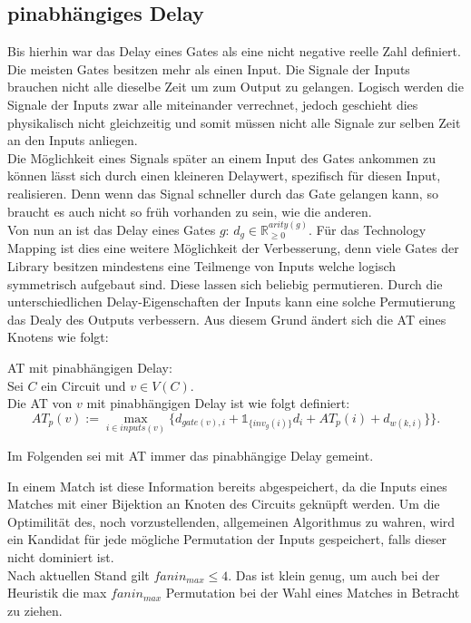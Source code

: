 \documentclass[11pt, a4paper, german]{article}
\newcommand{\TM}{Technology  Mapping }
\begin{document}
\subsection{pinabhängiges Delay}
\label{subsec:pinabh_delay}
Bis hierhin war das Delay eines Gates als eine nicht negative reelle Zahl definiert. Die meisten Gates besitzen mehr als einen Input. Die Signale der Inputs brauchen nicht alle dieselbe Zeit um zum Output zu gelangen. Logisch werden die Signale der Inputs zwar alle miteinander verrechnet, jedoch geschieht dies physikalisch nicht gleichzeitig und somit müssen nicht alle Signale zur selben Zeit an den Inputs anliegen.\\
Die Möglichkeit eines Signals später an einem Input des Gates ankommen zu können lässt sich durch einen kleineren Delaywert, spezifisch für diesen Input, realisieren. Denn wenn das Signal schneller durch das Gate gelangen kann, so braucht es auch nicht so früh vorhanden zu sein, wie die anderen. \\
Von nun an ist das Delay eines Gates $g$: $d_g \in \mathbb{R}_{\geq 0}^{arity(g)}$. Für das \TM ist dies eine weitere Möglichkeit der Verbesserung, denn viele Gates der Library besitzen mindestens eine Teilmenge von Inputs welche logisch symmetrisch aufgebaut sind. Diese lassen sich beliebig permutieren. Durch die unterschiedlichen Delay-Eigenschaften der Inputs kann eine solche Permutierung das Dealy des Outputs verbessern. Aus diesem Grund ändert sich die AT eines Knotens wie folgt: 
\begin{definition}{AT mit pinabhängigen Delay:}\\
	Sei $C$ ein Circuit und $v \in V(C)$.\\
	Die AT von $v$ mit pinabhängigen Delay ist wie folgt definiert: \[ AT_p(v) :=  \max\limits_{i \in inputs(v)} \{   d_{gate(v),i} + \mathbb{1}_{\{inv_g(i) \}} d_{i} + AT_p(i) + d_{w(k,i)} \}   \}.\]
\end{definition}
Im Folgenden sei mit AT immer das pinabhängige Delay gemeint.

In einem Match ist diese Information bereits abgespeichert, da die Inputs eines Matches mit einer Bijektion an Knoten des Circuits geknüpft werden. Um die Optimilität des, noch vorzustellenden, allgemeinen Algorithmus zu wahren, wird ein Kandidat für jede mögliche Permutation der Inputs gespeichert, falls dieser nicht dominiert ist.\\
Nach aktuellen Stand gilt $fanin_{max} \leq 4$. Das ist klein genug, um auch bei der Heuristik die max $fanin_{max}$ Permutation bei der Wahl eines Matches in Betracht zu ziehen. 
\end{document}
